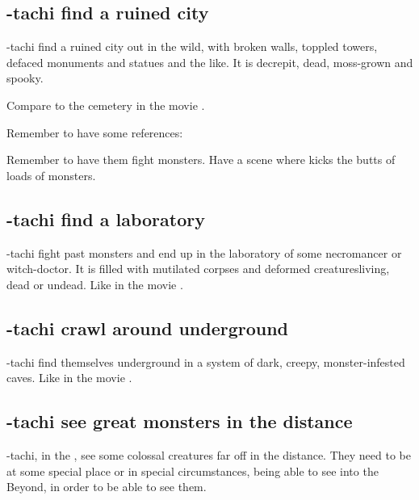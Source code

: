\subsection{\Shilred-tachi find a ruined city}
\Shilred-tachi find a ruined city out in the wild, with broken walls, toppled towers, defaced monuments and statues and the like. It is decrepit, dead, moss-grown and spooky. 

Compare to the cemetery in the movie \cite{Movie:HouseoftheDead}. 

Remember to have some references: 

Remember to have them fight monsters. Have a scene where \Dzasselid{} kicks the butts of loads of monsters. 







\subsection{\Shilred-tachi find a laboratory}
\Shilred-tachi fight past monsters and end up in the laboratory of some necromancer or witch-doctor. It is filled with mutilated corpses and deformed creatures\dash living, dead or undead. Like in the movie \cite{Movie:HouseoftheDead}. 







\subsection{\Shilred-tachi crawl around underground}
\Shilred-tachi find themselves underground in a system of dark, creepy, monster-infested caves. Like in the movie \cite{Movie:HouseoftheDead}. 








\subsection{\Shilred{}-tachi see great monsters in the distance}
\Shilred-tachi, \travelling in the \Wylde{}, see some colossal creatures far off in the distance. They need to be at some special place or in special circumstances, being able to see into the Beyond, in order to be able to see them. 

